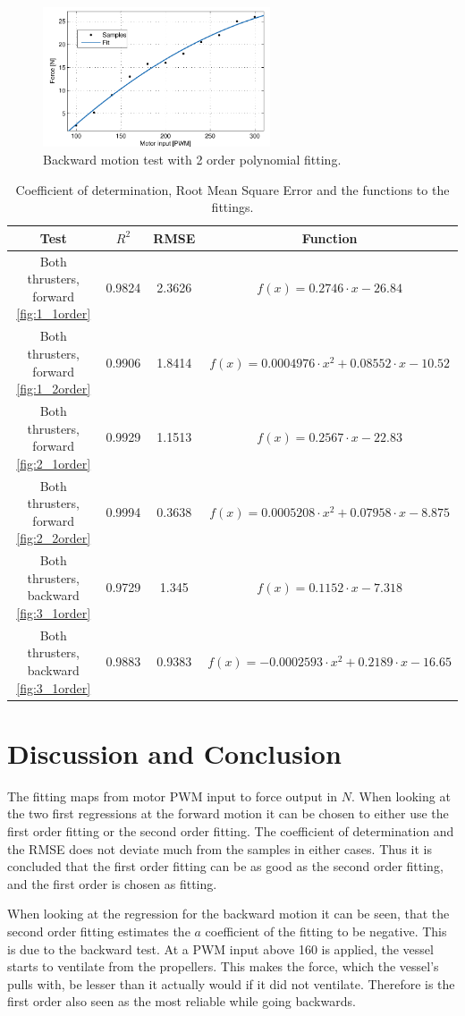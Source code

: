 \begin{figure}[htbp]
	\centering
	\includegraphics[width=0.6\textwidth]{plot/both_force_3_2order}
	\caption{Backward motion test with 2 order polynomial fitting.}
	\label{fig:3_2order}
\end{figure}

\begin{table}[htbp]
\centering
\begin{tabular}{cccc}
	\toprule
  Test & $R^2$ & RMSE & Function\\
  \midrule
  Both thrusters, forward \ref{fig:1_1order} & 0.9824 & 2.3626 & $f(x)=0.2746\cdot x-26.84$\\
  Both thrusters, forward \ref{fig:1_2order} & 0.9906 & 1.8414 & $f(x)=0.0004976\cdot x^2+0.08552\cdot x-10.52$\\
  Both thrusters, forward \ref{fig:2_1order} & 0.9929 & 1.1513 & $f(x)=0.2567\cdot x-22.83$\\
  Both thrusters, forward \ref{fig:2_2order} & 0.9994 & 0.3638 & $f(x)=0.0005208\cdot x^2+0.07958\cdot x-8.875$\\
  Both thrusters, backward \ref{fig:3_1order} & 0.9729 & 1.345 & $f(x)=0.1152\cdot x-7.318$\\
  Both thrusters, backward \ref{fig:3_1order} & 0.9883 & 0.9383 & $f(x)=-0.0002593\cdot x^2+0.2189\cdot x-16.65$\\
  \bottomrule
\end{tabular}
\caption{Coefficient of determination, Root Mean Square Error and the functions to the fittings.}
\label{tab:fitting}
\end{table}

\section{Discussion and Conclusion}
The fitting maps from motor \ac{PWM} input to force output in $N$. When looking at the two first regressions at the forward motion it can be chosen to either use the first order fitting or the second order fitting. The coefficient of determination and the RMSE does not deviate much from the samples in either cases. Thus it is concluded that the first order fitting can be as good as the second order fitting, and the first order is chosen as fitting.

When looking at the regression for the backward motion it can be seen, that the second order fitting estimates the $a$ coefficient of the fitting to be negative. This is due to the backward test. At a \ac{PWM} input above 160 is applied, the vessel starts to ventilate from the propellers. This makes the force, which the vessel's pulls with, be lesser than it actually would if it did not ventilate. Therefore is the first order also seen as the most reliable while going backwards.
